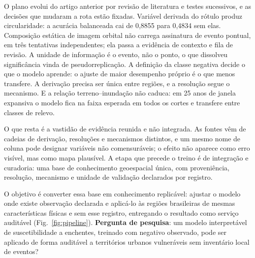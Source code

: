\documentclass[conference]{IEEEtran}
\begin{document}
O plano evolui do artigo anterior por revisão de literatura e testes
sucessivos, e as decisões que mudaram a rota estão fixadas. Variável derivada
do rótulo produz circularidade: a acurácia balanceada cai de 0,8855 para 0,4834
sem elas. Composição estática de imagem orbital não carrega assinatura de evento
pontual, em três tentativas independentes; ela passa a evidência de contexto e
fila de revisão. A unidade de informação é o evento, não o ponto, o
que dissolveu significância vinda de pseudorreplicação. A definição da
classe negativa decide o que o modelo aprende: o ajuste de maior desempenho
próprio é o que menos transfere. A derivação precisa ser única entre regiões, e a
resolução segue o mecanismo. E a relação terreno--inundação não caduca: em 25
anos de janela expansiva o modelo fica na faixa esperada em todos os cortes e
transfere entre classes de relevo.

O que resta é a vastidão de evidência reunida e não integrada. As fontes
vêm de cadeias de derivação, resoluções e mecanismos distintos,
e um mesmo nome de coluna pode designar variáveis não comensuráveis; o efeito não aparece como erro visível, mas como mapa plausível. A etapa
que precede o treino é de integração e curadoria: uma base de conhecimento
geoespacial única, com proveniência, resolução, mecanismo e unidade
de validação declarados por registro.

O objetivo é converter essa base em conhecimento replicável: ajustar o modelo
onde existe observação declarada e aplicá-lo às regiões brasileiras de mesmas
características físicas e sem esse registro, entregando o resultado como serviço
auditável (Fig.~\ref{fig:pipeline}).
\textbf{Pergunta de pesquisa}: um modelo interpretável de suscetibilidade a
enchentes, treinado com negativo observado, pode ser aplicado de forma auditável
a territórios urbanos vulneráveis sem inventário local de eventos?
\end{document}
